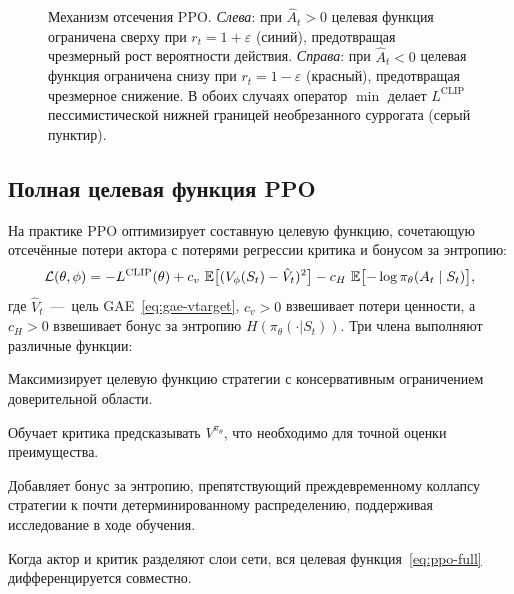 \begin{figure}[ht]
\caption{Механизм отсечения PPO. \emph{Слева}: при $\hat{A}_t > 0$ целевая функция ограничена сверху при $r_t = 1+\varepsilon$ (синий), предотвращая чрезмерный рост вероятности действия. \emph{Справа}: при $\hat{A}_t < 0$ целевая функция ограничена снизу при $r_t = 1-\varepsilon$ (красный), предотвращая чрезмерное снижение. В обоих случаях оператор $\min$ делает $L^{\mathrm{CLIP}}$ пессимистической нижней границей необрезанного суррогата (серый пунктир).}
\label{fig:ppo-clip}
\end{figure}

\subsection{Полная целевая функция PPO}

На практике PPO оптимизирует составную целевую функцию, сочетающую отсечённые потери актора с потерями регрессии критика и бонусом за энтропию:
\begin{equation}
\label{eq:ppo-full}
\mathcal{L}(\theta, \phi)
= -L^{\mathrm{CLIP}}(\theta)
  + c_v\,\operatorname{\mathbb{E}}\bigl[(V_\phi(S_t) - \hat{V}_t)^2\bigr]
  - c_H\,\operatorname{\mathbb{E}}\bigl[-\log\pi_\theta(A_t \mid S_t)\bigr],
\end{equation}
где $\hat{V}_t$ \,---\, цель GAE~\eqref{eq:gae-vtarget}, $c_v > 0$ взвешивает потери ценности, а $c_H > 0$ взвешивает бонус за энтропию $H(\pi_\theta({\cdot}|S_t))$. Три члена выполняют различные функции:
\begin{description}[leftmargin=!, labelwidth=3.5cm]
  \item[$-L^{\mathrm{CLIP}}$] Максимизирует целевую функцию стратегии с консервативным ограничением доверительной области.
  \item[$c_v\,L^{\mathrm{VF}}$] Обучает критика предсказывать $V^{\pi_\theta}$, что необходимо для точной оценки преимущества.
  \item[$-c_H\,H$] Добавляет бонус за энтропию, препятствующий преждевременному коллапсу стратегии к почти детерминированному распределению, поддерживая исследование в ходе обучения.
\end{description}
Когда актор и критик разделяют слои сети, вся целевая функция~\eqref{eq:ppo-full} дифференцируется совместно.

